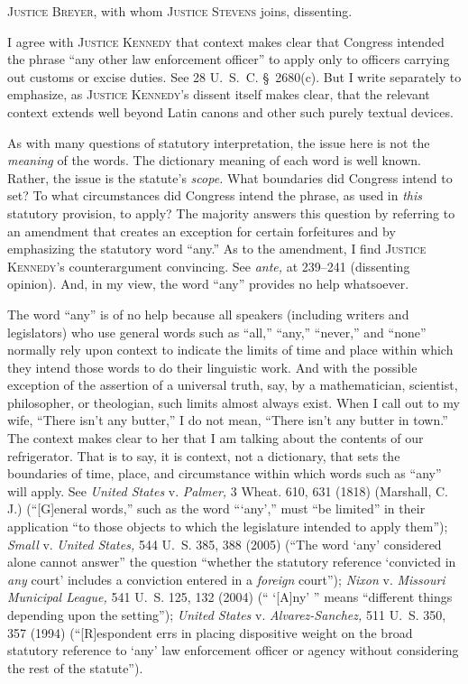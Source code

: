 
\setcounter{page}{243}

  \textsc{Justice Breyer,} with whom \textsc{Justice Stevens} joins, dissenting.

  I agree with \textsc{Justice Kennedy} that context makes clear that Congress intended the phrase ``any other law enforcement officer'' to apply only to officers carrying out customs or excise duties. See 28 U.~S.~C. \S~2680(c). But I write separately to emphasize, as \textsc{Justice Kennedy}'s dissent itself makes clear, that the relevant context extends well beyond Latin canons and other such purely textual devices.

  As with many questions of statutory interpretation, the issue here is not the \emph{meaning} of the words. The dictionary meaning of each word is well known. Rather, the issue is the statute's \emph{scope.} What boundaries did Congress intend to set? To what circumstances did Congress intend the phrase, as used in \emph{this} statutory provision, to apply? The majority answers this question by referring to an amendment that creates an exception for certain forfeitures and by emphasizing the statutory word ``any.'' As to the amendment, I find \textsc{Justice Kennedy}'s counterargument convincing. See \emph{ante,} at 239--241 (dissenting opinion). And, in my view, the word ``any'' provides no help whatsoever.

  The word ``any'' is of no help because all speakers (including writers and legislators) who use general words such as ``all,'' ``any,'' ``never,'' and ``none'' normally rely upon context to indicate the limits of time and place within which they intend those words to do their linguistic work. And with the possible exception of the assertion of a universal truth, say, by a mathematician, scientist, philosopher, or theologian, such limits almost always exist. When I call out to my wife, \newpage  ``There isn't any butter,'' I do not mean, ``There isn't any butter in town.'' The context makes clear to her that I am talking about the contents of our refrigerator. That is to say, it is context, not a dictionary, that sets the boundaries of time, place, and circumstance within which words such as ``any'' will apply. See \emph{United States} v. \emph{Palmer,} 3 Wheat. 610, 631 (1818) (Marshall, C. J.) (``[G]eneral words,'' such as the word ``‘any','' must ``be limited'' in their application ``to those objects to which the legislature intended to apply them''); \emph{Small} v. \emph{United States,} 544 U.~S. 385, 388 (2005) (``The word ‘any' considered alone cannot answer'' the question ``whether the statutory reference ‘convicted in \emph{any} court' includes a conviction entered in a \emph{foreign} court''); \emph{Nixon} v. \emph{Missouri Municipal League,} 541 U.~S. 125, 132 (2004) (`` ‘[A]ny' '' means ``different things depending upon the setting''); \emph{United States} v. \emph{Alvarez-Sanchez,} 511 U.~S. 350, 357 (1994) (``[R]espondent errs in placing dispositive weight on the broad statutory reference to ‘any' law enforcement officer or agency without considering the rest of the statute'').

